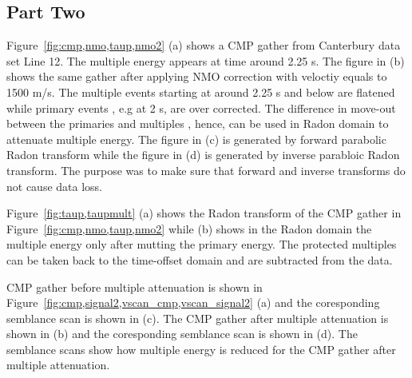 \subsection{Part Two}




Figure~\ref{fig:cmp,nmo,taup,nmo2} (a) shows a CMP gather from Canterbury data set Line 12. The multiple energy appears at time around 2.25 s. The figure in (b)  shows the same gather after applying NMO correction with veloctiy equals to 1500 m/s. The multiple events starting at around 2.25 s and below are flatened while primary events , e.g at 2 s,  are over corrected. The difference in move-out between the primaries and multiples , hence, can be used in Radon domain to attenuate multiple energy.
The figure in (c) is generated by forward parabolic Radon transform while the figure in (d) is generated by inverse parabloic Radon transform. The purpose was to make sure that forward and inverse transforms do not cause data loss.



Figure~\ref{fig:taup,taupmult} (a) shows the Radon transform of the CMP gather in Figure~\ref{fig:cmp,nmo,taup,nmo2} while (b) shows in the Radon domain the multiple energy only after mutting the primary energy. The protected multiples can be taken back to the time-offset domain and are subtracted from the data.


CMP gather before multiple attenuation is shown in Figure~\ref{fig:cmp,signal2,vscan_cmp,vscan_signal2} (a) and the coresponding semblance scan is shown in (c). The CMP gather after multiple attenuation is shown in (b) and the coresponding semblance scan is shown in (d). The semblance scans show how multiple energy is reduced for the CMP gather after multiple attenuation.

